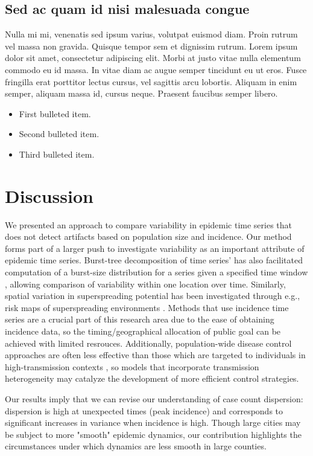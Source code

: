 \documentclass[10pt,letterpaper]{article}
\begin{document}
\subsection*{Sed ac quam id nisi malesuada congue}

Nulla mi mi, venenatis sed ipsum varius, volutpat euismod diam. Proin rutrum vel massa non gravida. Quisque tempor sem et dignissim rutrum. Lorem ipsum dolor sit amet, consectetur adipiscing elit. Morbi at justo vitae nulla elementum commodo eu id massa. In vitae diam ac augue semper tincidunt eu ut eros. Fusce fringilla erat porttitor lectus cursus, vel sagittis arcu lobortis. Aliquam in enim semper, aliquam massa id, cursus neque. Praesent faucibus semper libero.

\begin{itemize}
	\item First bulleted item.
	\item Second bulleted item.
	\item Third bulleted item.
\end{itemize}

\section*{Discussion}
We presented an approach to compare variability in epidemic time series that does not detect artifacts based on population size and incidence. 
Our method forms part of a larger push to investigate variability as an important attribute of epidemic time series.
Burst-tree decomposition of time series’ has also facilitated computation of a burst-size distribution for a series given a specified time window \cite{jo_burst-tree_2020}, allowing comparison of variability within one location over time. 
Similarly, spatial variation in superspreading potential has been investigated through e.g., risk maps of superspreading environments \cite{loo_identification_2021}. Methods that use incidence time series are a crucial part of this research area due to the ease of obtaining incidence data, so the timing/geographical allocation of public  goal can be achieved with limited resrouces. 
Additionally, population-wide disease control approaches are often less effective than those which are targeted to individuals in high-transmission contexts \cite{lloyd-smith_superspreading_2005}, so models that incorporate transmission heterogeneity may catalyze the development of more efficient control strategies.

Our results imply that we can revise our understanding of case count dispersion: dispersion is high at unexpected times (peak incidence) and corresponds to significant increases in variance when incidence is high. 
Though large cities may be subject to more "smooth" epidemic dynamics, our contribution highlights the circumstances under which dynamics are less smooth in large counties. 
\end{document}
